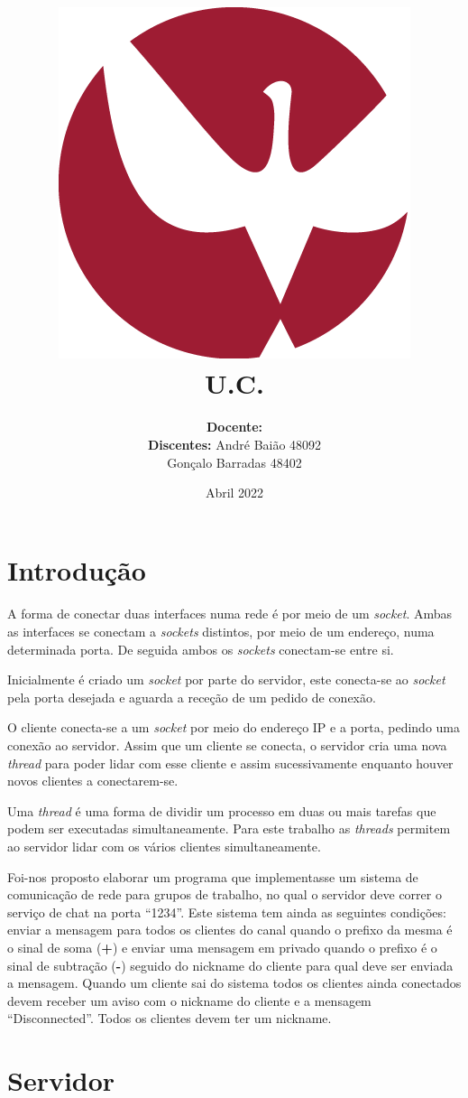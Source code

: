 \documentclass{article}
\title{ \includegraphics[scale=0.3]{imagens/uevora.png}\\
U.C. \UC\\
\textbf{\work}}
\author{
\textbf{Docente: }\docente\\
\textbf{Discentes: } André Baião 48092\\
\hspace{3.3cm} Gonçalo Barradas 48402
}
\date{Abril 2022}
\begin{document}
\maketitle
\thispagestyle{empty}
\newpage
\setcounter{page}{1}
\section{Introdução}
\paragraph{}

A forma de conectar duas interfaces numa rede é por meio de um \emph{socket}. Ambas as interfaces se conectam a \emph{sockets} distintos, por meio de um endereço, numa determinada porta. De seguida ambos os \emph{sockets} conectam-se entre si.

Inicialmente é criado um \emph{socket} por parte do servidor, este conecta-se ao \emph{socket} pela porta desejada e aguarda a receção de um pedido de conexão.

O cliente conecta-se a um \emph{socket} por meio do endereço IP e a porta, pedindo uma conexão ao servidor. Assim que um cliente se conecta, o servidor cria uma nova \emph{thread} para poder lidar com esse cliente e assim sucessivamente enquanto houver novos clientes a conectarem-se.

Uma \emph{thread} é uma forma de dividir um processo em duas ou mais tarefas que podem ser executadas simultaneamente. Para este trabalho as \emph{threads} permitem ao servidor lidar com os vários clientes simultaneamente. 

Foi-nos proposto elaborar um programa que implementasse um sistema de comunicação de rede para grupos de trabalho, no qual o servidor deve correr o serviço de chat na porta “1234”. Este sistema tem ainda as seguintes condições:  enviar a mensagem para todos os clientes do canal quando o prefixo da mesma é o sinal de soma (\textbf{+}) e enviar uma mensagem em privado quando o prefixo é o sinal de subtração (\textbf{-}) seguido do nickname do cliente para qual deve ser enviada a mensagem. Quando um cliente sai do sistema todos os clientes ainda conectados devem receber um aviso com o nickname do cliente e a mensagem “Disconnected”. Todos os clientes devem ter um nickname.

\section{Servidor}
\end{document}
